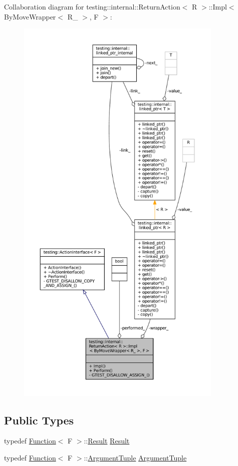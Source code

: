Collaboration diagram for testing\+:\+:internal\+:\+:Return\+Action$<$ R $>$\+:\+:Impl$<$ By\+Move\+Wrapper$<$ R\+\_\+ $>$, F $>$\+:
\nopagebreak
\begin{figure}[H]
\begin{center}
\leavevmode
\includegraphics[height=550pt]{classtesting_1_1internal_1_1ReturnAction_1_1Impl_3_01ByMoveWrapper_3_01R___01_4_00_01F_01_4__coll__graph}
\end{center}
\end{figure}
\subsection*{Public Types}
\begin{DoxyCompactItemize}
\item 
typedef \hyperlink{structtesting_1_1internal_1_1Function}{Function}$<$ F $>$\+::\hyperlink{classtesting_1_1ActionInterface_a7477de2fe3e4e01c59db698203acaee7}{Result} \hyperlink{classtesting_1_1internal_1_1ReturnAction_1_1Impl_3_01ByMoveWrapper_3_01R___01_4_00_01F_01_4_a9b727fcbbd1fa17e03a78d115fc81707}{Result}
\item 
typedef \hyperlink{structtesting_1_1internal_1_1Function}{Function}$<$ F $>$\+::\hyperlink{classtesting_1_1ActionInterface_af72720d864da4d606629e83edc003511}{Argument\+Tuple} \hyperlink{classtesting_1_1internal_1_1ReturnAction_1_1Impl_3_01ByMoveWrapper_3_01R___01_4_00_01F_01_4_a5b68d6715914e165ade5864060aa4213}{Argument\+Tuple}
\end{DoxyCompactItemize}
